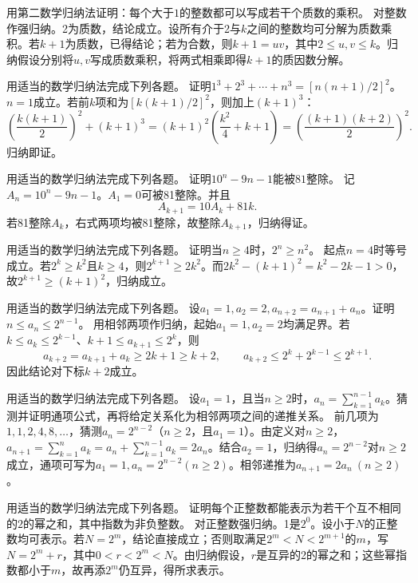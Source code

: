 用第二数学归纳法证明：每个大于\(1\)的整数都可以写成若干个质数的乘积。
\solutionanswer
对整数作强归纳。2为质数，结论成立。设所有介于2与\(k\)之间的整数均可分解为质数乘积。若\(k+1\)为质数，已得结论；若为合数，则\(k+1=uv\)，其中\(2\le u,v\le k\)。归纳假设分别将\(u,v\)写成质数乘积，将两式相乘即得\(k+1\)的质因数分解。


用适当的数学归纳法完成下列各题。
证明\(1^3+2^3+\cdots+n^3=[n(n+1)/2]^2\)。
\solutionanswer
\(n=1\)成立。若前\(k\)项和为\([k(k+1)/2]^2\)，则加上\((k+1)^3\)：
\[\left(\frac{k(k+1)}2\right)^2+(k+1)^3=(k+1)^2\left(\frac{k^2}4+k+1\right)=\left(\frac{(k+1)(k+2)}2\right)^2.\]
归纳即证。


用适当的数学归纳法完成下列各题。
证明\(10^n-9n-1\)能被\(81\)整除。
\solutionanswer
记\(A_n=10^n-9n-1\)。\(A_1=0\)可被81整除。并且
\[A_{k+1}=10A_k+81k.\]
若81整除\(A_k\)，右式两项均被81整除，故整除\(A_{k+1}\)，归纳得证。


用适当的数学归纳法完成下列各题。
证明当\(n\ge4\)时，\(2^n\ge n^2\)。
\solutionanswer
起点\(n=4\)时等号成立。若\(2^k\ge k^2\)且\(k\ge4\)，则\(2^{k+1}\ge2k^2\)。而\(2k^2-(k+1)^2=k^2-2k-1>0\)，故\(2^{k+1}\ge(k+1)^2\)，归纳成立。


用适当的数学归纳法完成下列各题。
设\(a_1=1,a_2=2,a_{n+2}=a_{n+1}+a_n\)。证明\(n\le a_n\le2^{n-1}\)。
\solutionanswer
用相邻两项作归纳，起始\(a_1=1,a_2=2\)均满足界。若\(k\le a_k\le2^{k-1}\)、\(k+1\le a_{k+1}\le2^k\)，则
\[a_{k+2}=a_{k+1}+a_k\ge2k+1\ge k+2,\qquad a_{k+2}\le2^k+2^{k-1}\le2^{k+1}.\]
因此结论对下标\(k+2\)成立。


用适当的数学归纳法完成下列各题。
设\(a_1=1\)，且当\(n\ge2\)时，\(a_n=\sum_{k=1}^{n-1}a_k\)。猜测并证明通项公式，再将给定关系化为相邻两项之间的递推关系。
\solutionanswer
前几项为\(1,1,2,4,8,\ldots\)，猜测\(a_n=2^{n-2}\)（\(n\ge2\)，且\(a_1=1\)）。由定义对\(n\ge2\)，\(a_{n+1}=\sum_{k=1}^{n}a_k=a_n+\sum_{k=1}^{n-1}a_k=2a_n\)。结合\(a_2=1\)，归纳得\(a_n=2^{n-2}\)对\(n\ge2\)成立，通项可写为\(a_1=1, a_n=2^{n-2}(n\ge2)\)。相邻递推为\(a_{n+1}=2a_n\ (n\ge2)\)。


用适当的数学归纳法完成下列各题。
证明每个正整数都能表示为若干个互不相同的\(2\)的幂之和，其中指数为非负整数。
\solutionanswer
对正整数强归纳。1是\(2^0\)。设小于\(N\)的正整数均可表示。若\(N=2^m\)，结论直接成立；否则取满足\(2^m<N<2^{m+1}\)的\(m\)，写\(N=2^m+r\)，其中\(0<r<2^m<N\)。由归纳假设，\(r\)是互异的2的幂之和；这些幂指数都小于\(m\)，故再添\(2^m\)仍互异，得所求表示。
\par
